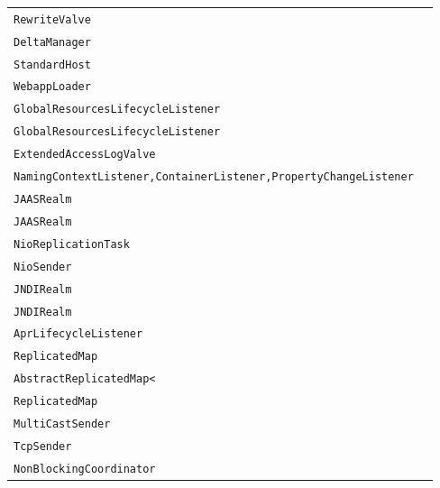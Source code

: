 \begin{center}
\begin{tabular}{ll}
\lstinline/RewriteValve/&\raisebox{0pt}{\lstinline/ parse(BufferedReaderreader)/}\\ 
\lstinline/DeltaManager/&\raisebox{0pt}{\lstinline/ messageReceived(SessionMessage)/}\\ 
\lstinline/StandardHost/&\raisebox{0pt}{\lstinline/ startInternal()/}\\ 
\lstinline/WebappLoader/&\raisebox{0pt}{\lstinline/ booleanbuildClassPath(StringBuilder,ClassLoader)/}\\ 
\lstinline/GlobalResourcesLifecycleListener/&\raisebox{0pt}{\lstinline/ createMBeans(String)/}\\ 
\lstinline/GlobalResourcesLifecycleListener/&\raisebox{0pt}{\lstinline/ createMBeans(String)/}\\ 
\lstinline/ExtendedAccessLogValve/&\raisebox{0pt}{\lstinline/ AccessLogElementgetServletRequestElement(String)/}\\ 
\lstinline/NamingContextListener,ContainerListener,PropertyChangeListener/&\raisebox{0pt}{\lstinline/ removeResourceLink(String)/}\\ 
\lstinline/JAASRealm/&\raisebox{0pt}{\lstinline/ Principalauthenticate(String,CallbackHandler)/}\\ 
\lstinline/JAASRealm/&\raisebox{0pt}{\lstinline/ Principalauthenticate(String,CallbackHandler)/}\\ 
\lstinline/NioReplicationTask/&\raisebox{0pt}{\lstinline/ sendAck(Selection)/}\\ 
\lstinline/NioSender/&\raisebox{0pt}{\lstinline/ disconnect()/}\\ 
\lstinline/JNDIRealm/&\raisebox{0pt}{\lstinline/ startInternal()/}\\ 
\lstinline/JNDIRealm/&\raisebox{0pt}{\lstinline/ startInternal()/}\\ 
\lstinline/AprLifecycleListener/&\raisebox{0pt}{\lstinline/ initializeSSL())/}\\ 
\lstinline/ReplicatedMap/&\raisebox{0pt}{\lstinline/ memberDisappeared(Member)/}\\ 
\lstinline/AbstractReplicatedMap</&\raisebox{0pt}{\lstinline/ Vput()/}\\ 
\lstinline/ReplicatedMap/&\raisebox{0pt}{\lstinline/ memberDisappeared(Member)/}\\ 
\lstinline/MultiCastSender/&\raisebox{0pt}{\lstinline/ intsend(String)/}\\ 
\lstinline/TcpSender/&\raisebox{0pt}{\lstinline/ intsend(String)/}\\ 
\lstinline/NonBlockingCoordinator/&\raisebox{0pt}{\lstinline/ fireInterceptorEvent(InterceptorEvent)/}\\ 

\end{tabular}
\end{center}
